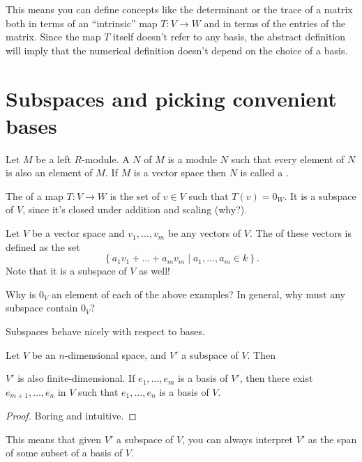 This means you can define concepts like the determinant or the trace of a matrix
both in terms of an ``intrinsic'' map $T : V \to W$ and in terms of the entries of the matrix.
Since the map $T$ itself doesn't refer to any basis,
the abstract definition will imply that the numerical definition doesn't depend on the choice of a basis.
\section{Subspaces and picking convenient bases}
\begin{definition}
	Let $M$ be a left $R$-module. 
	A  $N$ of $M$ is a module $N$
	such that every element of $N$ is also an element of $M$.
	If $M$ is a vector space then $N$ is called a .
\end{definition}

\begin{example}[Kernels]
	The  of a map $T : V \to W$ is the
	set of $v \in V$ such that $T(v) = 0_W$.
	It is a subspace of $V$, since it's closed under addition and scaling (why?).
\end{example}
\begin{example}[Spans]
	Let $V$ be a vector space and $v_1, \dots, v_m$ be any vectors of $V$.
	The  of these vectors is defined as the set
	\[ \left\{ a_1v_1 + \dots + a_mv_m \mid a_1, \dots, a_m \in k \right\}. \]
	Note that it is a subspace of $V$ as well!
\end{example}
\begin{ques}
	Why is $0_V$ an element of each of the above examples?
	In general, why must any subspace contain $0_V$?
\end{ques}

Subspaces behave nicely with respect to bases.
\begin{theorem}
	Let $V$ be an $n$-dimensional space, and $V'$ a subspace of $V$.
	Then 
	\begin{enumerate}[(a)]
		\ii $V'$ is also finite-dimensional.
		\ii If $e_1, \dots, e_m$ is a basis of $V'$, then there exist
		$e_{m+1}, \dots, e_n$ in $V$ such that
		$e_1, \dots, e_n$ is a basis of $V$.
	\end{enumerate}
\end{theorem}
\begin{proof}
	Boring and intuitive.
\end{proof}
This means that given $V'$ a subspace of $V$,
you can always interpret $V'$ as the span of some subset of a basis of $V$.

